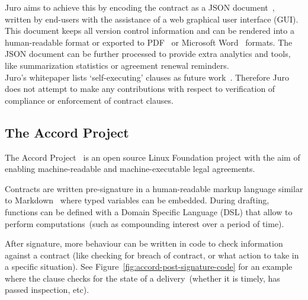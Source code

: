 Juro aims to achieve this by encoding the contract as a JSON document~\cite{jsonSpec}, written by end-users
with the assistance of a web graphical user interface (GUI).
This document keeps all version control information and can be rendered into a human-readable format or exported
to PDF~\cite{pdf2020spec} or Microsoft Word~\cite{microsoftWordWeb} formats.
The JSON document can be further processed to provide extra analytics and tools, like summarization statistics or
agreement renewal reminders.\\

Juro's whitepaper lists `self-executing' clauses as future work~\cite[p.~6]{juroWhitepaper}.
Therefore Juro does not attempt to make any contributions with respect to verification of compliance or enforcement of
contract clauses.

\subsection{The Accord Project}\label{subsec:accord}

The Accord Project~\cite{accordHomepage} is an open source Linux Foundation project with the aim of enabling
machine-readable and machine-executable legal agreements.

Contracts are written pre-signature in a human-readable markup language similar to Markdown~\cite{markdownSpec}
where typed variables can be embedded.
During drafting, functions can be defined with a Domain Specific Language (DSL) that allow to perform
computations~(such as compounding interest over a period of time).

After signature, more behaviour can be written in code to check information against a contract (like checking for
breach of contract, or what action to take in a specific situation).
See Figure~\ref{fig:accord-post-signature-code} for an example where the clause checks for the state of a
delivery~(whether it is timely, has passed inspection, etc).\\

